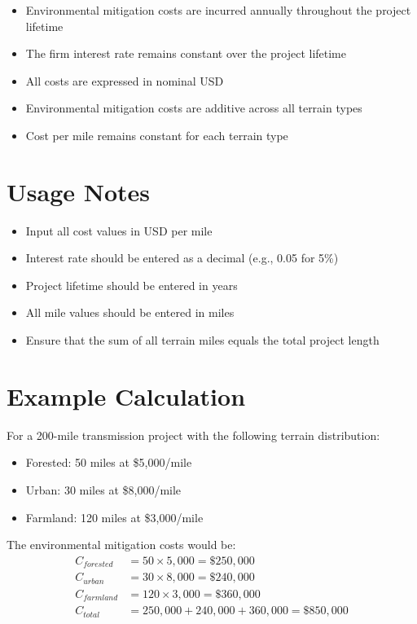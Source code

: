\documentclass[12pt]{article}
\begin{document}
\begin{itemize}
    \item Environmental mitigation costs are incurred annually throughout the project lifetime
    \item The firm interest rate remains constant over the project lifetime
    \item All costs are expressed in nominal USD
    \item Environmental mitigation costs are additive across all terrain types
    \item Cost per mile remains constant for each terrain type
\end{itemize}

\section{Usage Notes}

\begin{itemize}
    \item Input all cost values in USD per mile
    \item Interest rate should be entered as a decimal (e.g., 0.05 for 5\%)
    \item Project lifetime should be entered in years
    \item All mile values should be entered in miles
    \item Ensure that the sum of all terrain miles equals the total project length
\end{itemize}

\section{Example Calculation}

For a 200-mile transmission project with the following terrain distribution:
\begin{itemize}
    \item Forested: 50 miles at \$5,000/mile
    \item Urban: 30 miles at \$8,000/mile
    \item Farmland: 120 miles at \$3,000/mile
\end{itemize}

The environmental mitigation costs would be:
\begin{align}
C_{forested} &= 50 \times 5,000 = \$250,000 \\
C_{urban} &= 30 \times 8,000 = \$240,000 \\
C_{farmland} &= 120 \times 3,000 = \$360,000 \\
C_{total} &= 250,000 + 240,000 + 360,000 = \$850,000
\end{align}
\end{document}
